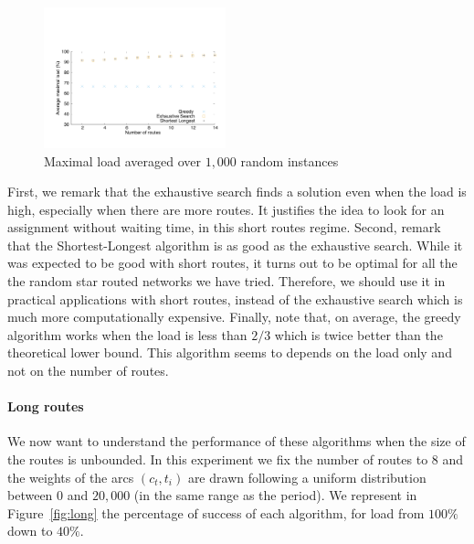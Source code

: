 \documentclass[10pt, conference, letterpaper]{IEEEtran}
\begin{document}
        
      \begin{figure}[h]
      \begin{center}
	 \includegraphics[width=0.47\textwidth]{periode_petite.pdf}
      \end{center}
      \caption{Maximal load averaged over $1,000$ random instances}\label{fig:short}
      \end{figure}
      First, we remark that the exhaustive search finds a solution even when the load is high, especially when there are more routes.
      It justifies the idea to look for an assignment without waiting time, in this short routes regime.
      Second, remark that the Shortest-Longest algorithm is as good as the exhaustive search. While it was expected to be good with short routes, it turns out to be optimal for all the the random star routed networks we have tried. Therefore, we should use it in practical applications with short routes, instead of the exhaustive search which is much more computationally expensive. 
      Finally, note that, on average, the greedy algorithm works when the load is less than $2/3$ which is twice better than the theoretical lower bound. This algorithm seems to depends on the load only and not on the number of routes.
      
        \paragraph{Long routes}
      
      We now want to understand the performance of these algorithms when the size of the routes is unbounded. In this experiment we fix the number of routes to $8$ and the weights of the arcs $(c_t,t_i)$ are drawn following a uniform distribution between $0$ and $20,000$ (in the same range as the period). We represent in Figure~\ref{fig:long} the percentage of success of each algorithm, for load from $100\%$ down to $40\%$.
      
\end{document}
